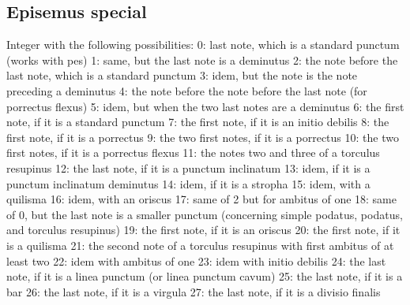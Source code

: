\subsection{Episemus special}
Integer with the following possibilities:
    0: last note, which is a standard punctum (works with pes)
    1: same, but the last note is a deminutus
    2: the note before the last note, which is a standard punctum
    3: idem, but the note is the note preceding a deminutus
    4: the note before the note before the last note (for porrectus flexus)
    5: idem, but when the two last notes are a deminutus
    6: the first note, if it is a standard punctum
    7: the first note, if it is an initio debilis
    8: the first note, if it is a porrectus
    9: the two first notes, if it is a porrectus
    10: the two first notes, if it is a porrectus flexus
    11: the notes two and three of a torculus resupinus
    12: the last note, if it is a punctum inclinatum
    13: idem, if it is a punctum inclinatum deminutus
    14: idem, if it is a stropha
    15: idem, with a quilisma
    16: idem, with an oriscus
    17: same of 2 but for ambitus of one
    18: same of 0, but the last note is a smaller punctum (concerning simple podatus, podatus, and torculus resupinus)
    19: the first note, if it is an oriscus
    20: the first note, if it is a quilisma
    21: the second note of a torculus resupinus with first ambitus of at least two
    22: idem with ambitus of one
    23: idem with initio debilis
    24: the last note, if it is a linea punctum (or linea punctum cavum)
    25: the last note, if it is a bar
    26: the last note, if it is a virgula
    27: the last note, if it is a divisio finalis


